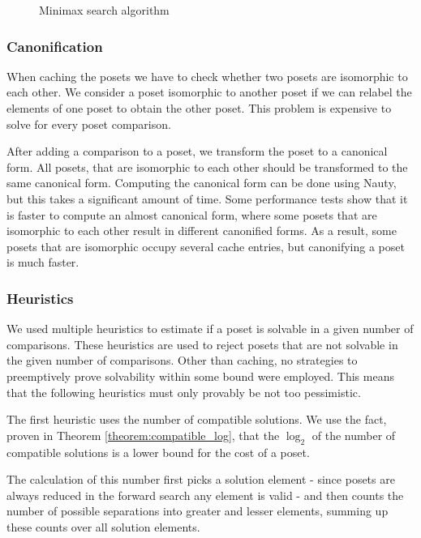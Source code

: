 \documentclass[10pt,journal,compsoc]{IEEEtran}
\begin{document}
\begin{figure}[!b]
  \centering
  
  \caption{Minimax search algorithm}
  \label{fig:minimax_search}
\end{figure}

\subsubsection{Canonification}

When caching the posets we have to check whether two posets are isomorphic to each other.
We consider a poset isomorphic to another poset if we can relabel the elements of one poset to obtain the other poset.
This problem is expensive to solve for every poset comparison.

After adding a comparison to a poset, we transform the poset to a canonical form.
All posets, that are isomorphic to each other should be transformed to the same canonical form.
Computing the canonical form can be done using Nauty, but this takes a significant amount of time.
Some performance tests show that it is faster to compute an almost canonical form, where some posets that are isomorphic to each other result in different canonified forms.
As a result, some posets that are isomorphic occupy several cache entries, but canonifying a poset is much faster.

\subsubsection{Heuristics}

We used multiple heuristics to estimate if a poset is solvable in a given number of comparisons.
These heuristics are used to reject posets that are not solvable in the given number of comparisons.
Other than caching, no strategies to preemptively prove solvability within some bound were employed.
This means that the following heuristics must only provably be not too pessimistic.

The first heuristic uses the number of compatible solutions.
We use the fact, proven in Theorem \ref{theorem:compatible_log}, that the $\log_2$ of the number of compatible solutions is a lower bound for the cost of a poset.

The calculation of this number first picks a solution element - since posets are always reduced in the forward search any element is valid - and then counts the number of possible separations into greater and lesser elements, summing up these counts over all solution elements.
\end{document}

